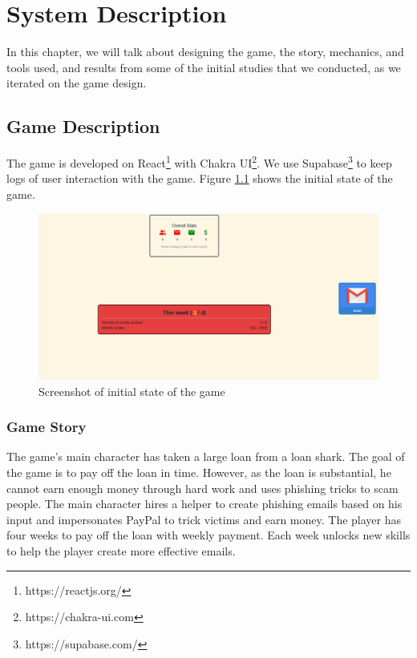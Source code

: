 




\chapter{System Description}

In this chapter, we will talk about designing the game, the story, mechanics, and tools used, and results from some of the initial studies that we conducted, as we iterated on the game design.

\section{Game Description}
The game is developed on React\footnote{https://reactjs.org/} with Chakra UI\footnote{https://chakra-ui.com}. We use Supabase\footnote{https://supabase.com/} to keep logs of user interaction with the game. Figure \ref{fig:screenshot} shows the initial state of the game.

\begin{figure}[h]
    \centering
    \includegraphics[width=1 \textwidth]{figures/section2/game.png}
    \caption{Screenshot of initial state of the game}
    \label{fig:screenshot}
\end{figure}

\subsection{Game Story}
The game's main character has taken a large loan from a loan shark. The goal of the game is to pay off the loan in time. However, as the loan is substantial, he cannot earn enough money through hard work and uses phishing tricks to scam people. The main character hires a helper to create phishing emails based on his input and impersonates PayPal to trick victims and earn money. The player has four weeks to pay off the loan with weekly payment. Each week unlocks new skills to help the player create more effective emails.

